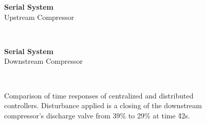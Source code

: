 \ifmakeplots
\begin{figure}
  {\centering\large\textbf{Serial System}\\ Upstream Compressor\\[1em]}
  \begin{subfigure}{0.48\linewidth}
    \footnotesize
    
    \normalsize
    \caption{}
    \label{fig:res:serial-timeresp:p1}
  \end{subfigure}
  \hfill
  \begin{subfigure}{0.48\linewidth}
    \footnotesize
    
    \normalsize
    \caption{}
    \label{fig:res:serial-timeresp:sd1}
  \end{subfigure}
  \\
  \begin{subfigure}{0.48\linewidth}
    \footnotesize
    
    \normalsize
    \caption{}
    \label{fig:res:serial-timeresp:td1}
  \end{subfigure}
  \hfill
  \begin{subfigure}{0.48\linewidth}
    \footnotesize
    
    \normalsize
    \caption{}
    \label{fig:res:serial-timeresp:ur1}
  \end{subfigure}
\end{figure}

\begin{figure}
  \ContinuedFloat
  {\centering\large\textbf{Serial System}\\ Downstream Compressor\\[1em]}
  \begin{subfigure}{0.48\linewidth}
    \centering
    \footnotesize
    
    \normalsize
    \caption{}
    \label{fig:res:serial-timeresp:p2}
  \end{subfigure}
  \hfill
  \begin{subfigure}{0.48\linewidth}
    \centering
    \footnotesize
    
    \normalsize
    \caption{}
    \label{fig:res:serial-timeresp:sd2}
  \end{subfigure}
  \\
  \begin{subfigure}{0.48\linewidth}
    \centering
    \footnotesize
    
    \normalsize
    \caption{}
    \label{fig:res:serial-timeresp:td2}
  \end{subfigure}
  \hfill
  \begin{subfigure}{0.48\linewidth}
    \centering
    \footnotesize
    
    \normalsize
    \caption{}
    \label{fig:res:serial-timeresp:ur2}
  \end{subfigure}

  \caption[Time response of serial system.]{Comparison of time responses of centralized and distributed controllers. Disturbance applied is a closing of the downstream compressor's discharge valve from 39\% to 29\% at time \u{42}{s}.}
  \label{fig:res:serial-timeresp}
\end{figure}

